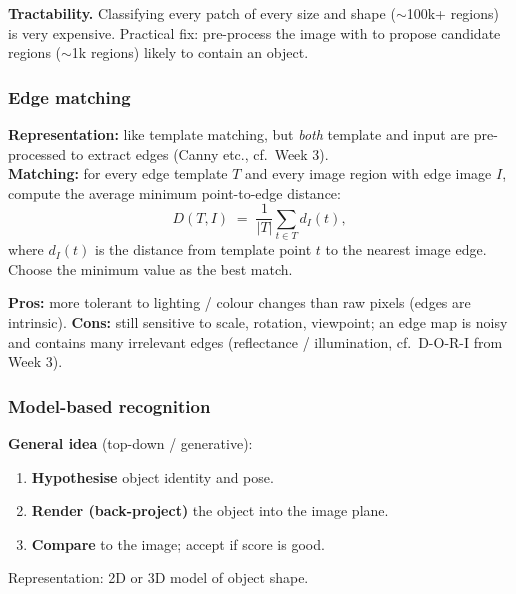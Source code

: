 \textbf{Tractability.} Classifying every patch of every size and shape ($\sim$100k+ regions) is very expensive. Practical fix: pre-process the image with  to propose candidate regions ($\sim$1k regions) likely to contain an object.

\bigseparator

\subsubsection{Edge matching}

\begin{defbox}
\textbf{Representation:} like template matching, but \emph{both} template and input are pre-processed to extract edges (Canny etc., cf.\ Week 3). \\
\textbf{Matching:} for every edge template $T$ and every image region with edge image $I$, compute the average minimum point-to-edge distance:
\[
D(T, I) \;=\; \frac{1}{|T|}\sum_{t \in T} d_I(t),
\]
where $d_I(t)$ is the distance from template point $t$ to the nearest image edge. Choose the minimum value as the best match.
\end{defbox}

\textbf{Pros:} more tolerant to lighting / colour changes than raw pixels (edges are intrinsic). \textbf{Cons:} still sensitive to scale, rotation, viewpoint; an edge map is noisy and contains many irrelevant edges (reflectance / illumination, cf.\ D-O-R-I from Week 3).

\bigseparator

\subsubsection{Model-based recognition}

\begin{defbox}
\textbf{General idea} (top-down / generative):
\begin{enumerate}
  \item \textbf{Hypothesise} object identity and pose.
  \item \textbf{Render (back-project)} the object into the image plane.
  \item \textbf{Compare} to the image; accept if score is good.
\end{enumerate}
Representation: 2D or 3D model of object shape.
\end{defbox}

